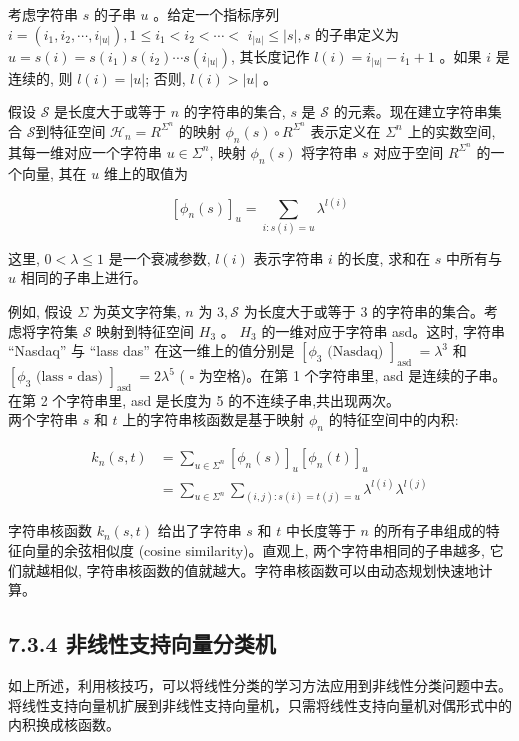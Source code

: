 \documentclass[10pt]{article}
\begin{document}
考虑字符串 $s$ 的子串 $u$ 。给定一个指标序列 $i=\left(i_{1}, i_{2}, \cdots, i_{|u|}\right), 1 \leqslant i_{1}<i_{2}<\cdots<$ $i_{|u|} \leqslant|s|, s$ 的子串定义为 $u=s(i)=s\left(i_{1}\right) s\left(i_{2}\right) \cdots s\left(i_{|u|}\right)$, 其长度记作 $l(i)=i_{|u|}-i_{1}+1$ 。如果 $i$ 是连续的, 则 $l(i)=|u|$; 否则, $l(i)>|u|$ 。

假设 $\mathcal{S}$ 是长度大于或等于 $n$ 的字符串的集合, $s$ 是 $\mathcal{S}$ 的元素。现在建立字符串集合 $\mathcal{S}$到特征空间 $\mathcal{H}_{n}=R^{\Sigma^{n}}$ 的映射 $\phi_{n}(s) \circ R^{\Sigma^{n}}$ 表示定义在 $\Sigma^{n}$ 上的实数空间, 其每一维对应一个字符串 $u \in \Sigma^{n}$, 映射 $\phi_{n}(s)$ 将字符串 $s$ 对应于空间 $R^{\Sigma^{n}}$ 的一个向量, 其在 $u$ 维上的取值为


\begin{equation*}
\left[\phi_{n}(s)\right]_{u}=\sum_{i: s(i)=u} \lambda^{l(i)} \tag{7.92}
\end{equation*}


这里, $0<\lambda \leqslant 1$ 是一个衰减参数, $l(i)$ 表示字符串 $i$ 的长度, 求和在 $s$ 中所有与 $u$ 相同的子串上进行。

例如, 假设 $\Sigma$ 为英文字符集, $n$ 为 $3, \mathcal{S}$ 为长度大于或等于 3 的字符串的集合。考虑将字符集 $\mathcal{S}$ 映射到特征空间 $H_{3}$ 。 $H_{3}$ 的一维对应于字符串 asd。这时, 字符串 “Nasdaq” 与 “lass das” 在这一维上的值分别是 $\left[\phi_{3} \text { (Nasdaq) }\right]_{\text {asd }}=\lambda^{3}$ 和 $\left[\phi_{3} \text { (lass } \square \text { das) }\right]_{\text {asd }}=2 \lambda^{5}$ ( $\square$ 为空格)。在第 1 个字符串里, asd 是连续的子串。在第 2 个字符串里, asd 是长度为 5 的不连续子串,共出现两次。\\
两个字符串 $s$ 和 $t$ 上的字符串核函数是基于映射 $\phi_{n}$ 的特征空间中的内积:


\begin{align*}
k_{n}(s, t) & =\sum_{u \in \Sigma^{n}}\left[\phi_{n}(s)\right]_{u}\left[\phi_{n}(t)\right]_{u} \\
& =\sum_{u \in \Sigma^{n}} \sum_{(i, j): s(i)=t(j)=u} \lambda^{l(i)} \lambda^{l(j)} \tag{7.93}
\end{align*}


字符串核函数 $k_{n}(s, t)$ 给出了字符串 $s$ 和 $t$ 中长度等于 $n$ 的所有子串组成的特征向量的余弦相似度 (cosine similarity)。直观上, 两个字符串相同的子串越多, 它们就越相似, 字符串核函数的值就越大。字符串核函数可以由动态规划快速地计算。

\subsection*{7.3.4 非线性支持向量分类机}
如上所述，利用核技巧，可以将线性分类的学习方法应用到非线性分类问题中去。将线性支持向量机扩展到非线性支持向量机，只需将线性支持向量机对偶形式中的内积换成核函数。
\end{document}
